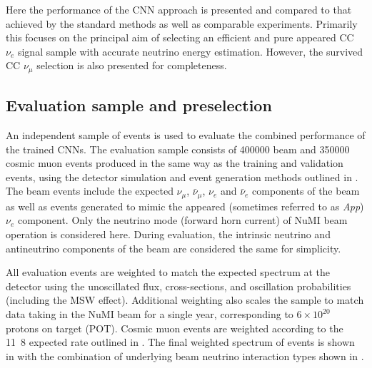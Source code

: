 Here the performance of the CNN approach is presented and compared to that achieved by the
standard \chips methods as well as comparable experiments. Primarily this focuses on the principal
aim of selecting an efficient and pure appeared CC $\nu_{e}$ signal sample with accurate neutrino
energy estimation. However, the survived CC $\nu_{\mu}$ selection is also presented for
completeness.

\subsection{Evaluation sample and preselection} %
\label{sec:results_eval_sample} %

An independent sample of events is used to evaluate the combined performance of the trained CNNs.
The evaluation sample consists of 400000 beam and 350000 cosmic muon events produced in the same
way as the training and validation events, using the detector simulation and event generation
methods outlined in . The beam events include the expected
$\nu_{\mu}$, $\bar{\nu}_{\mu}$, $\nu_{e}$ and $\bar{\nu}_{e}$ components of the beam as well as
events generated to mimic the appeared (sometimes referred to as \emph{App}) $\nu_{e}$ component.
Only the neutrino mode (forward horn current) of NuMI beam operation is considered here. During
evaluation, the intrinsic neutrino and antineutrino components of the beam are considered the same
for simplicity.

All evaluation events are weighted to match the expected spectrum at the \chipsfive detector using
the unoscillated flux, cross-sections, and oscillation probabilities (including the MSW effect).
Additional weighting also scales the sample to match data taking in the NuMI beam for a single
year, corresponding to $6\times 10^{20}$ protons on target (POT). Cosmic muon events are weighted
according to the \unit{11.8}{} expected \chipsfive rate outlined in
. The final weighted spectrum of events is shown in
 with the combination of underlying beam neutrino interaction
types shown in .

